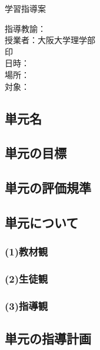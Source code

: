 \documentclass{ltjsarticle}
\begin{document}
\begin{center}
  \Large{学習指導案}
\end{center}
\hfill 指導教諭：\\
\hfill 授業者：大阪大学理学部\\
\hfill 印\\
日時：\\
場所：\\
対象：\\
\subsection{単元名}

\subsection{単元の目標}

\subsection{単元の評価規準}

\subsection{単元について}
  \subsubsection*{(1)教材観}
  \subsubsection*{(2)生徒観}
  \subsubsection*{(3)指導観}
\subsection{単元の指導計画}
\end{document}
